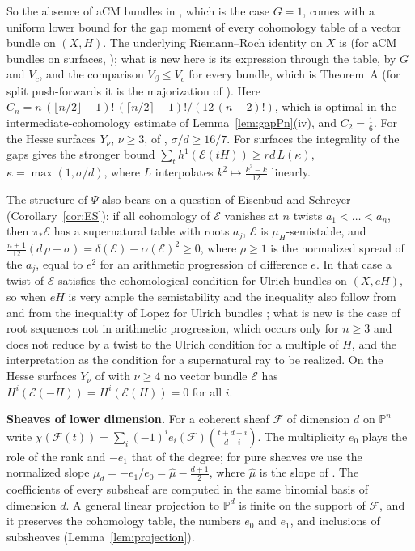 \documentclass[11pt]{amsart}
\theoremstyle{definition}
\theoremstyle{remark}
\newcommand{\PP}{\mathbb{P}}
\newcommand{\cE}{\mathcal{E}}
\newcommand{\cF}{\mathcal{F}}
\begin{document}
So the absence of aCM bundles in \cite{An2}, which is the case $G=1$, comes with a uniform lower bound for the gap moment of every cohomology table of a vector bundle on $(X,H)$. The underlying Riemann--Roch identity on $X$ is \cite[Prop.~10.6, (10.3)]{An3} (for aCM bundles on surfaces, \cite[Prop.~2.6]{An2}); what is new here is its expression through the table, by $G$ and $V_c$, and the comparison $V_\beta\le V_c$ for every bundle, which is Theorem~A (for split push-forwards it is the majorization of \cite[Lemma~10.8]{An3}). Here $C_n=n\,(\lfloor n/2\rfloor-1)!\,(\lceil n/2\rceil-1)!/(12\,(n-2)!)$, which is optimal in the intermediate-cohomology estimate of Lemma~\ref{lem:gapPn}(iv), and $C_2=\frac16$. For the Hesse surfaces $Y_\nu$, $\nu\ge3$, of \cite{An2}, $\sigma/d\ge16/7$. For surfaces the integrality of the gaps gives the stronger bound $\sum_th^1(\cE(tH))\ge rd\,L(\kappa)$, $\kappa=\max(1,\sigma/d)$, where $L$ interpolates $k^2\mapsto\frac{k^3-k}{12}$ linearly.

The structure of $\Psi$ also bears on a question of Eisenbud and Schreyer (Corollary~\ref{cor:ES}): if all cohomology of $\cE$ vanishes at $n$ twists $a_1<\dots<a_n$, then $\pi_*\cE$ has a supernatural table with roots $a_j$, $\cE$ is $\mu_H$-semistable, and $\frac{n+1}{12}(d\,\rho-\sigma)=\delta(\cE)-\alpha(\cE)^2\ge0$, where $\rho\ge1$ is the normalized spread of the $a_j$, equal to $e^2$ for an arithmetic progression of difference $e$. In that case a twist of $\cE$ satisfies the cohomological condition for Ulrich bundles on $(X,eH)$, so when $eH$ is very ample the semistability and the inequality also follow from \cite{CH12} and from the inequality of Lopez for Ulrich bundles \cite[Lem.~3.1]{Lo26}; what is new is the case of root sequences not in arithmetic progression, which occurs only for $n\ge3$ and does not reduce by a twist to the Ulrich condition for a multiple of $H$, and the interpretation as the condition for a supernatural ray to be realized. On the Hesse surfaces $Y_\nu$ of \cite{An2} with $\nu\ge4$ no vector bundle $\cE$ has $H^i(\cE(-H))=H^i(\cE(H))=0$ for all $i$.

\medskip\noindent\textbf{Sheaves of lower dimension.}
For a coherent sheaf $\cF$ of dimension $d$ on $\PP^n$ write $\chi(\cF(t))=\sum_i(-1)^ie_i(\cF)\binom{t+d-i}{d-i}$. The multiplicity $e_0$ plays the role of the rank and $-e_1$ that of the degree; for pure sheaves we use the normalized slope $\mu_d=-e_1/e_0=\hat\mu-\frac{d+1}2$, where $\hat\mu$ is the slope of \cite[\S1.6]{HL10}. The coefficients of every subsheaf are computed in the same binomial basis of dimension $d$. A general linear projection to $\PP^d$ is finite on the support of $\cF$, and it preserves the cohomology table, the numbers $e_0$ and $e_1$, and inclusions of subsheaves (Lemma~\ref{lem:projection}).
\end{document}
